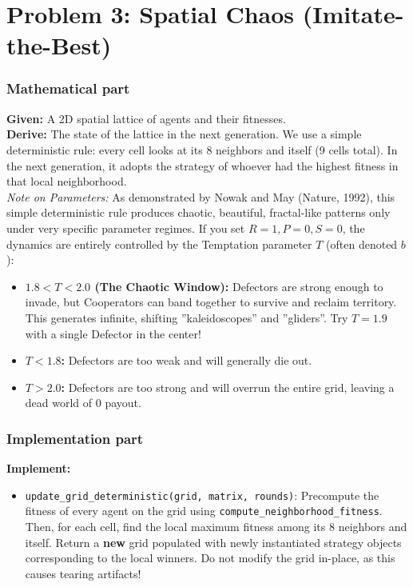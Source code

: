 \documentclass[11pt]{article}
\begin{document}
\section*{Problem 3: Spatial Chaos (Imitate-the-Best)}

\subsubsection*{Mathematical part}
\textbf{Given:} A 2D spatial lattice of agents and their fitnesses. \\
\textbf{Derive:} The state of the lattice in the next generation. We use a simple deterministic rule: every cell looks at its 8 neighbors and itself (9 cells total). In the next generation, it adopts the strategy of whoever had the highest fitness in that local neighborhood. \\

\textit{Note on Parameters:} As demonstrated by Nowak and May (Nature, 1992), this simple deterministic rule produces chaotic, beautiful, fractal-like patterns only under very specific parameter regimes. If you set $R=1, P=0, S=0$, the dynamics are entirely controlled by the Temptation parameter $T$ (often denoted $b$):
\begin{itemize}
    \item \textbf{$1.8 < T < 2.0$ (The Chaotic Window):} Defectors are strong enough to invade, but Cooperators can band together to survive and reclaim territory. This generates infinite, shifting ''kaleidoscopes'' and ''gliders''. Try $T=1.9$ with a single Defector in the center!
    \item \textbf{$T < 1.8$:} Defectors are too weak and will generally die out.
    \item \textbf{$T > 2.0$:} Defectors are too strong and will overrun the entire grid, leaving a dead world of 0 payout.
\end{itemize}

\subsubsection*{Implementation part}
\textbf{Implement:}
\begin{itemize}
    \item \lstinline|update_grid_deterministic(grid, matrix, rounds)|: Precompute the fitness of every agent on the grid using \lstinline|compute_neighborhood_fitness|. Then, for each cell, find the local maximum fitness among its 8 neighbors and itself. Return a \textbf{new} grid populated with newly instantiated strategy objects corresponding to the local winners. Do not modify the grid in-place, as this causes tearing artifacts!
\end{itemize}
\end{document}

